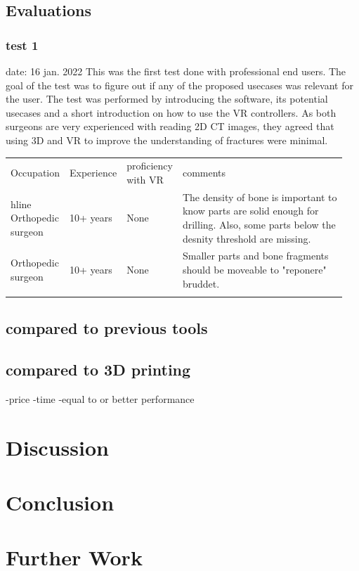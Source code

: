 \documentclass[a4paper]{report}
\begin{document}
\section{Evaluations}


\subsection{test 1}
date: 16 jan. 2022
This was the first test done with professional end users. The goal of the test was to figure out if any of the proposed usecases was relevant for the user. The test was performed by introducing the software, its potential usecases and a short introduction on how to use the VR controllers.
As both surgeons are very experienced with reading 2D CT images, they agreed that using 3D and VR to improve the understanding of fractures were minimal.

\begin{table}[ht]
\begin{tabular}{p{0.15\linewidth} |p{0.15\linewidth} |p{0.15\linewidth} | p{0.5\linewidth}}
Occupation         & Experience & proficiency with VR & comments                                                                                                                                \\hline
Orthopedic surgeon & 10+ years  & None                & The density of bone is important to know parts are solid enough for drilling. Also, some parts below the desnity threshold are missing. \\
Orthopedic surgeon & 10+ years  & None                & Smaller parts and bone fragments should be moveable to "reponere" bruddet.                                                              \\
                   &            &                     &
\end{tabular}
\end{table}

\section{compared to previous tools}

\section{compared to 3D printing}
-price
-time
-equal to or better performance

\chapter{Discussion}\label{Discussion}


\chapter{Conclusion} \label{Conclusion}

\chapter{Further Work} \label{Further Work}

\appendix



%
%
\printbibliography
\end{document}
